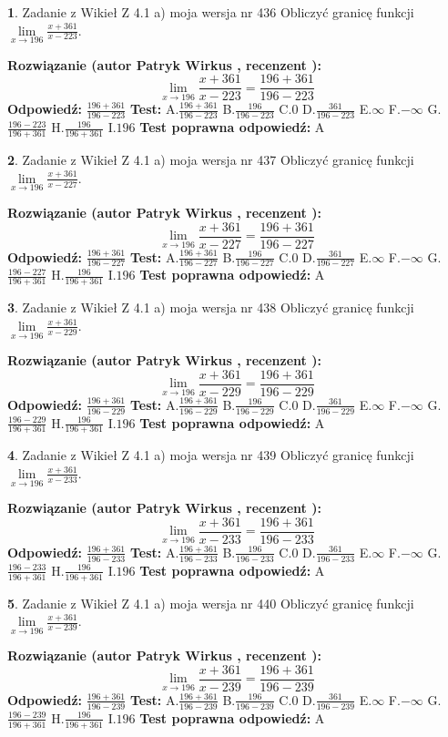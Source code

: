 \documentclass[12pt, a4paper]{article}
\theoremstyle{definition} %
\newtheorem{zad}{}
\newcommand{\zadStart}[1]{\begin{zad}#1\newline}
\newcommand{\zadStop}{\end{zad}}
\newcommand{\rozwStart}[2]{\noindent \textbf{Rozwiązanie (autor #1 , recenzent #2): }\newline}
\newcommand{\rozwStop}{\newline}
\newcommand{\odpStart}{\noindent \textbf{Odpowiedź:}\newline}
\newcommand{\odpStop}{\newline}
\newcommand{\testStart}{\noindent \textbf{Test:}\newline}
\newcommand{\testStop}{\newline}
\newcommand{\kluczStart}{\noindent \textbf{Test poprawna odpowiedź:}\newline}
\newcommand{\kluczStop}{\newline}
\begin{document}
\zadStart{Zadanie z Wikieł Z 4.1 a) moja wersja nr 436}
Obliczyć granicę funkcji $\lim\limits_{x\to196}\frac{x+361}{x-223}$.
\zadStop
\rozwStart{Patryk Wirkus}{}
$$\lim\limits_{x\to196}\frac{x+361}{x-223} = \frac{196+361}{196-223}$$
\rozwStop
\odpStart
$\frac{196+361}{196-223}$
\odpStop
\testStart
A.$\frac{196+361}{196-223}$
B.$\frac{196}{196-223}$
C.$0$
D.$\frac{361}{196-223}$
E.$\infty$
F.$-\infty$
G.$\frac{196-223}{196+361}$
H.$\frac{196}{196+361}$
I.$196$
\testStop
\kluczStart
A
\kluczStop



\zadStart{Zadanie z Wikieł Z 4.1 a) moja wersja nr 437}
Obliczyć granicę funkcji $\lim\limits_{x\to196}\frac{x+361}{x-227}$.
\zadStop
\rozwStart{Patryk Wirkus}{}
$$\lim\limits_{x\to196}\frac{x+361}{x-227} = \frac{196+361}{196-227}$$
\rozwStop
\odpStart
$\frac{196+361}{196-227}$
\odpStop
\testStart
A.$\frac{196+361}{196-227}$
B.$\frac{196}{196-227}$
C.$0$
D.$\frac{361}{196-227}$
E.$\infty$
F.$-\infty$
G.$\frac{196-227}{196+361}$
H.$\frac{196}{196+361}$
I.$196$
\testStop
\kluczStart
A
\kluczStop



\zadStart{Zadanie z Wikieł Z 4.1 a) moja wersja nr 438}
Obliczyć granicę funkcji $\lim\limits_{x\to196}\frac{x+361}{x-229}$.
\zadStop
\rozwStart{Patryk Wirkus}{}
$$\lim\limits_{x\to196}\frac{x+361}{x-229} = \frac{196+361}{196-229}$$
\rozwStop
\odpStart
$\frac{196+361}{196-229}$
\odpStop
\testStart
A.$\frac{196+361}{196-229}$
B.$\frac{196}{196-229}$
C.$0$
D.$\frac{361}{196-229}$
E.$\infty$
F.$-\infty$
G.$\frac{196-229}{196+361}$
H.$\frac{196}{196+361}$
I.$196$
\testStop
\kluczStart
A
\kluczStop



\zadStart{Zadanie z Wikieł Z 4.1 a) moja wersja nr 439}
Obliczyć granicę funkcji $\lim\limits_{x\to196}\frac{x+361}{x-233}$.
\zadStop
\rozwStart{Patryk Wirkus}{}
$$\lim\limits_{x\to196}\frac{x+361}{x-233} = \frac{196+361}{196-233}$$
\rozwStop
\odpStart
$\frac{196+361}{196-233}$
\odpStop
\testStart
A.$\frac{196+361}{196-233}$
B.$\frac{196}{196-233}$
C.$0$
D.$\frac{361}{196-233}$
E.$\infty$
F.$-\infty$
G.$\frac{196-233}{196+361}$
H.$\frac{196}{196+361}$
I.$196$
\testStop
\kluczStart
A
\kluczStop



\zadStart{Zadanie z Wikieł Z 4.1 a) moja wersja nr 440}
Obliczyć granicę funkcji $\lim\limits_{x\to196}\frac{x+361}{x-239}$.
\zadStop
\rozwStart{Patryk Wirkus}{}
$$\lim\limits_{x\to196}\frac{x+361}{x-239} = \frac{196+361}{196-239}$$
\rozwStop
\odpStart
$\frac{196+361}{196-239}$
\odpStop
\testStart
A.$\frac{196+361}{196-239}$
B.$\frac{196}{196-239}$
C.$0$
D.$\frac{361}{196-239}$
E.$\infty$
F.$-\infty$
G.$\frac{196-239}{196+361}$
H.$\frac{196}{196+361}$
I.$196$
\testStop
\kluczStart
A
\kluczStop
\end{document}
